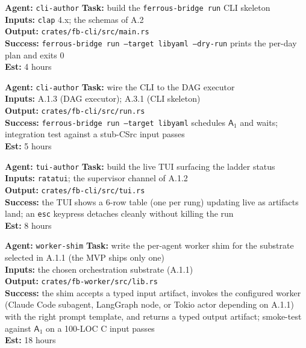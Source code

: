 \documentclass[12pt]{article}
\theoremstyle{definition}
\theoremstyle{remark}
\newcommand{\Agent}[1]{\ensuremath{\mathsf{#1}}}
\newenvironment{tasklist}{%
  \begingroup\raggedright
  \begin{description}[style=nextline, leftmargin=1.4cm, itemsep=0.4em]
}{%
  \end{description}
  \endgroup
}
\begin{document}
\begin{tasklist}
\item[\textbf{Task A.3.1}] \textbf{Agent:} \texttt{cli-author} \quad
  \textbf{Task:} build the \texttt{ferrous-bridge run} CLI skeleton\\
  \textbf{Inputs:} \texttt{clap} 4.x; the schemas of A.2\\
  \textbf{Output:} \texttt{crates/fb-cli/src/main.rs}\\
  \textbf{Success:}
  \texttt{ferrous-bridge run --target libyaml --dry-run} prints the
  per-day plan and exits 0\\
  \textbf{Est:} 4 hours

\item[\textbf{Task A.3.2}] \textbf{Agent:} \texttt{cli-author} \quad
  \textbf{Task:} wire the CLI to the DAG executor\\
  \textbf{Inputs:} A.1.3 (DAG executor); A.3.1 (CLI skeleton)\\
  \textbf{Output:} \texttt{crates/fb-cli/src/run.rs}\\
  \textbf{Success:}
  \texttt{ferrous-bridge run --target libyaml} schedules \(\Agent{A}_1\)
  and waits; integration test against a stub-CSrc input passes\\
  \textbf{Est:} 5 hours

\item[\textbf{Task A.3.3}] \textbf{Agent:} \texttt{tui-author} \quad
  \textbf{Task:} build the live TUI surfacing the ladder status\\
  \textbf{Inputs:} \texttt{ratatui}; the supervisor channel of A.1.2\\
  \textbf{Output:} \texttt{crates/fb-cli/src/tui.rs}\\
  \textbf{Success:} the TUI shows a 6-row table (one per rung)
  updating live as artifacts land; an \texttt{esc} keypress detaches
  cleanly without killing the run\\
  \textbf{Est:} 8 hours

\item[\textbf{Task A.3.4}] \textbf{Agent:} \texttt{worker-shim} \quad
  \textbf{Task:} write the per-agent worker shim for the substrate
  selected in A.1.1 (the MVP ships only one)\\
  \textbf{Inputs:} the chosen orchestration substrate (A.1.1)\\
  \textbf{Output:} \texttt{crates/fb-worker/src/lib.rs}\\
  \textbf{Success:} the shim accepts a typed input artifact, invokes
  the configured worker (Claude Code subagent, LangGraph node, or
  Tokio actor depending on A.1.1) with the right prompt template, and
  returns a typed output artifact; smoke-test against \(\Agent{A}_1\)
  on a 100-LOC C input passes\\
  \textbf{Est:} 18 hours


\end{tasklist}
\end{document}
